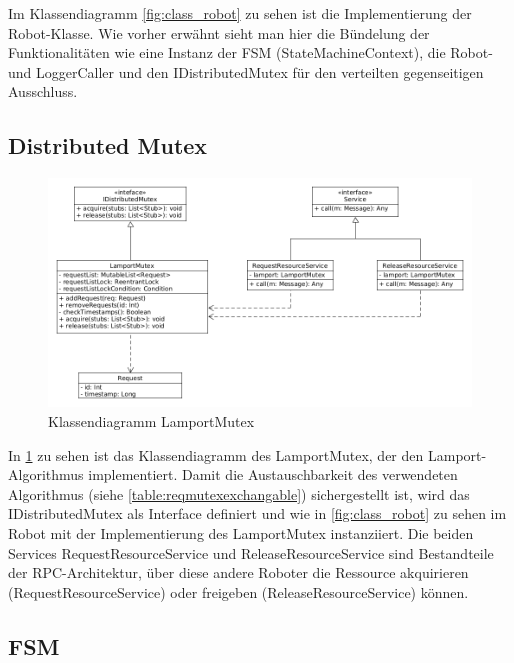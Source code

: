 Im Klassendiagramm \ref{fig:class_robot} zu sehen ist die Implementierung der Robot-Klasse.
Wie vorher erwähnt sieht man hier die Bündelung der Funktionalitäten wie eine 
Instanz der FSM (StateMachineContext), die Robot- und LoggerCaller und den IDistributedMutex für
den verteilten gegenseitigen Ausschluss.

\clearpage

\subsection{Distributed Mutex}

\begin{figure}[h]
 \includegraphics[width=\textwidth]{../diagrams/4_lamport_klassendiagramm.png}
 \caption{Klassendiagramm LamportMutex}
 \label{fig:class_lamport}
\end{figure}

In \ref{fig:class_lamport} zu sehen ist das Klassendiagramm des LamportMutex, der den Lamport-Algorithmus
implementiert. Damit die Austauschbarkeit des verwendeten Algorithmus (siehe \ref{table:reqmutexexchangable})
sichergestellt ist, wird das IDistributedMutex als Interface definiert und wie in \ref{fig:class_robot}
zu sehen im Robot mit der Implementierung des LamportMutex instanziiert. Die beiden Services RequestResourceService
und ReleaseResourceService sind Bestandteile der RPC-Architektur, über diese andere Roboter die Ressource
akquirieren (RequestResourceService) oder freigeben (ReleaseResourceService) können.

\clearpage

\subsection{FSM}

